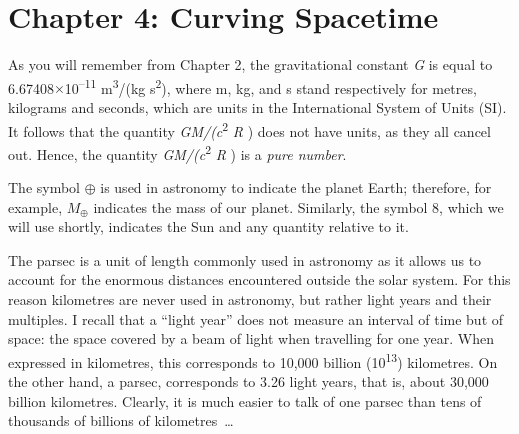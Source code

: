 \section*{Chapter 4: Curving Spacetime}
\begin{description}[style=multiline,leftmargin=2em,labelwidth=1.5em]

\item[1.]\hypertarget{note:04-01}{}As you will remember from Chapter 2, the gravitational constant \emph{G} is equal to
6.67408\(\times\)10\textsuperscript{--11} m\textsuperscript{3}/(kg
s\textsuperscript{2}), where m, kg, and s stand respectively for metres, kilograms and
seconds, which are units in the International System of Units (SI). It follows that the
quantity \emph{GM/(c}\textsuperscript{2} \emph{R} ) does not have units, as they all
cancel out. Hence, the quantity \emph{GM/(c}\textsuperscript{2} \emph{R} ) is a
\emph{pure number}.

\item[2.]\hypertarget{note:04-02}{}The symbol \(\oplus\) is used in astronomy to indicate the planet Earth; therefore, for
example, \(M_{\oplus}\) indicates the mass of our planet. Similarly, the symbol 8, which
we will use shortly, indicates the Sun and any quantity relative to it.

\item[3.]\hypertarget{note:04-03}{}The parsec is a unit of length commonly used in astronomy as it allows us to account for
the enormous distances encountered outside the solar system. For this reason kilometres
are never used in astronomy, but rather light years and their multiples. I recall that a
``light year'' does not measure an interval of time but of space: the space covered by a
beam of light when travelling for one year. When expressed in kilometres, this
corresponds to 10,000 billion (10\textsuperscript{13}) kilometres. On the other hand, a
parsec, corresponds to 3.26 light years, that is, about 30,000 billion kilometres.
Clearly, it is much easier to talk of one parsec than tens of thousands of billions of
kilometres~\ldots{}

\end{description}
